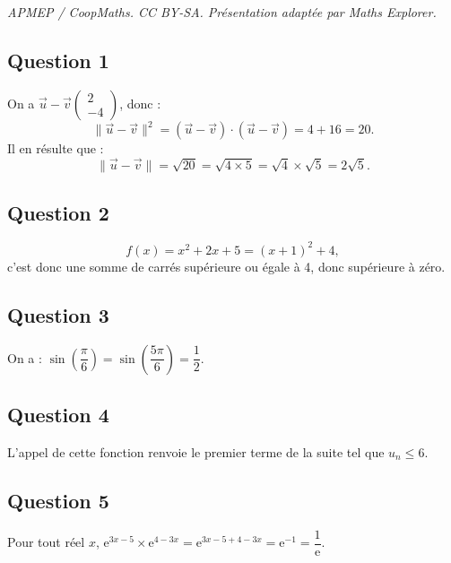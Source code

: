 \documentclass[10pt]{article}
\providecommand{\e}{{\mathrm{e}}}
\begin{document}
\noindent\textit{APMEP / CoopMaths. CC BY-SA. Présentation adaptée par Maths Explorer.}\par\medskip
\subsection*{Question 1}

On a \(\vec{u} - \vec{v}\begin{pmatrix} 2 \\ -4 \end{pmatrix}\), donc :
\[
\|\vec{u} - \vec{v}\|^2 = (\vec{u} - \vec{v}) \cdot (\vec{u} - \vec{v}) = 4 + 16 = 20.
\]
Il en résulte que :
\[
\|\vec{u} - \vec{v}\| = \sqrt{20} = \sqrt{4 \times 5} = \sqrt{4} \times \sqrt{5} = 2\sqrt{5}.
\]

\subsection*{Question 2}

\[
f(x) = x^2 + 2x + 5 = (x + 1)^2 + 4,
\]
c'est donc une somme de carrés supérieure ou égale à 4, donc supérieure à zéro.

\subsection*{Question 3}

On a : \(\sin\left(\dfrac{\pi}{6}\right) = \sin\left(\dfrac{5\pi}{6}\right) = \dfrac{1}{2}\).

\subsection*{Question 4}

L'appel de cette fonction renvoie le premier terme de la suite tel que \(u_n \leqslant 6\).

\subsection*{Question 5}

Pour tout réel \(x\), \(\e^{3x-5} \times \e^{4-3x} = \e^{3x-5+4-3x} = \e^{-1} = \dfrac{1}{\e}\).
\end{document}
